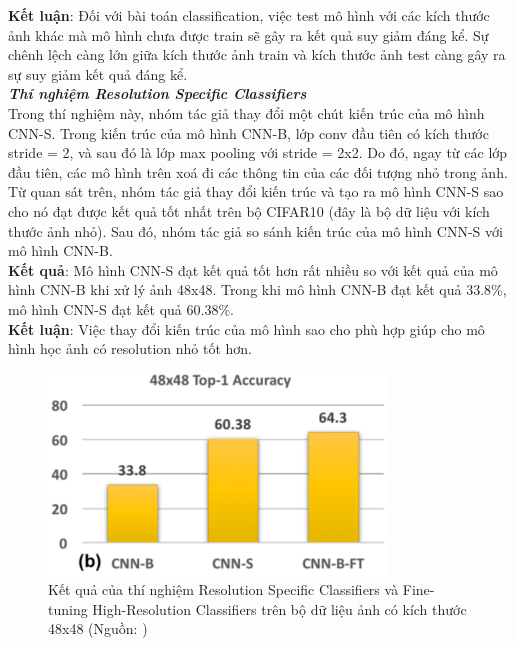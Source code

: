 {    \noindent
    \textbf{Kết luận}: Đối với bài toán classification, việc test mô hình với các kích thước ảnh khác mà mô hình chưa được train sẽ gây ra kết quả suy giảm đáng kể.
    Sự chênh lệch càng lớn giữa kích thước ảnh train và kích thước ảnh test càng gây ra sự suy giảm kết quả đáng kể. \\

    \noindent
    \textbf{\textit{Thí nghiệm Resolution Specific Classifiers}} \\
    Trong thí nghiệm này, nhóm tác giả thay đổi một chút kiến trúc của mô hình CNN-S.
    Trong kiến trúc của mô hình CNN-B, lớp conv đầu tiên có kích thước stride = 2, và sau đó là lớp max pooling với stride = 2x2.
    Do đó, ngay từ các lớp đầu tiên, các mô hình trên xoá đi các thông tin của các đối tượng nhỏ trong ảnh.
    Từ quan sát trên, nhóm tác giả thay đổi kiến trúc và tạo ra mô hình CNN-S sao cho nó đạt được kết quả tốt nhất trên bộ CIFAR10 (đây là bộ dữ liệu với kích thước ảnh nhỏ).
    Sau đó, nhóm tác giả so sánh kiến trúc của mô hình CNN-S với mô hình CNN-B. \\
    \textbf{Kết quả}: Mô hình CNN-S đạt kết quả tốt hơn rất nhiều so với kết quả của mô hình CNN-B khi xử lý ảnh 48x48.
    Trong khi mô hình CNN-B đạt kết quả 33.8\%, mô hình CNN-S đạt kết quả 60.38\%. \\
    \textbf{Kết luận}: Việc thay đổi kiến trúc của mô hình sao cho phù hợp giúp cho mô hình học ảnh có resolution nhỏ tốt hơn.

    \begin{figure}[H]
        \centering
        \includegraphics[width=9cm] {images/snip_res_spec_cls}
        \caption{Kết quả của thí nghiệm Resolution Specific Classifiers và Fine-tuning High-Resolution Classifiers trên bộ dữ liệu ảnh có kích thước 48x48 (Nguồn: \cite{singh2018analysis})}
        \label{fig:snip_res_spec_cls}
    \end{figure}

}
